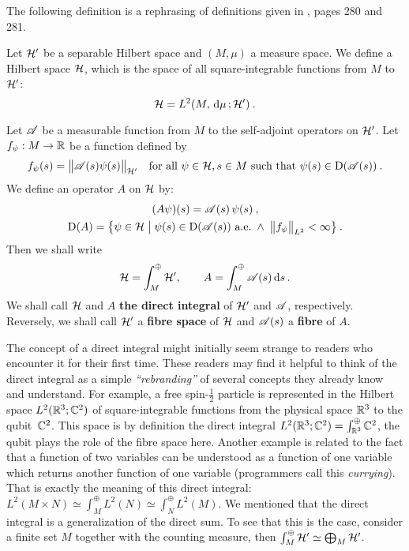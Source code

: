 The following definition is a rephrasing of definitions given in \citet{ReedSimon4}, pages 280 and 281.
\begin{defn}
    \label{defn-direct-integral}
    Let $\mathcal{H}'$ be a separable Hilbert space and $(M, \mu)$ a measure space. We define a Hilbert space $\mathcal{H}$, which is the space of all square-integrable functions from $M$ to $\mathcal{H}'$:
    \begin{equation*}
        \mathcal{H} = L^2(M, \, \mathrm{d}\mu \,; \mathcal{H}') \: .
    \end{equation*}

    Let $\mathscr{A}$ be a measurable function from $M$ to the self-adjoint operators on $\mathcal{H}'$. Let $f_\psi: M \to \mathbb{R}$ be a function defined by
    \begin{align*}
        f_\psi(s) = \big\lVert \mathscr{A}(s) \psi(s) \big\rVert_{\mathcal{H}'}
        \quad
        \text{for all } \psi \in \mathcal{H}, s \in M \text{ such that } \psi(s) \in \mathrm{D}(\mathscr{A}(s)) \: .
    \end{align*}
    We define an operator $A$ on $\mathcal{H}$ by:
    \begin{gather*}
        (A \psi)(s) = \mathscr{A}(s) \, \psi(s) \: , \\
        \mathrm{D}(A) = \big\{
            \psi \in \mathcal{H}
            \; \big| \;
            \psi(s) \in \mathrm{D}(\mathscr{A}(s)) \text{ a.e.}
            \; \wedge \;
            \big\lVert f_\psi \big\rVert_{L^2} < \infty
        \big\} \: .
    \end{gather*}
    Then we shall write
    \begin{gather*}
        \mathcal{H} = \int^\oplus_M \mathcal{H}', \qquad
        A = \int^\oplus_M \mathscr{A}(s) \, \mathrm{d}s \,.
    \end{gather*}
    We shall call $\mathcal{H}$ and $A$ \textbf{the direct integral} of $\mathcal{H}'$ and $\mathscr{A}$, respectively. Reversely, we shall call $\mathcal{H}'$ a \textbf{fibre space} of $\mathcal{H}$ and $\mathscr{A}(s)$ a \textbf{fibre} of $A$.
\end{defn}

The concept of a direct integral might initially seem strange to readers who encounter it for their first time. These readers may find it helpful to think of the direct integral as a simple \textit{“rebranding”} of several concepts they already know and understand. For example, a free spin-$\frac{1}{2}$ particle is represented in the Hilbert space $L^2(\mathbb{R}^3; \mathbb{C}^2)$ of square-integrable functions from the physical space $\mathbb{R}^3$ to the qubit~$\mathbb{C}^2$. This space is by definition the direct integral $L^2(\mathbb{R}^3; \mathbb{C}^2) = \int_{\mathbb{R}^3}^\oplus \mathbb{C}^2$, the qubit plays the role of the fibre space here. Another example is related to the fact that a function of two variables can be understood as a function of one variable which returns another function of one variable (programmers call this \textit{currying}). That is exactly the meaning of this direct integral: $L^2(M\times N) \simeq \int_M^\oplus L^2(N) \simeq \int_N^\oplus L^2(M)$. We mentioned that the direct integral is a generalization of the direct sum. To see that this is the case, consider a finite set $M$ together with the counting measure, then $\int^\oplus_M \mathcal{H}' \simeq \bigoplus_{M} \mathcal{H}'$.

